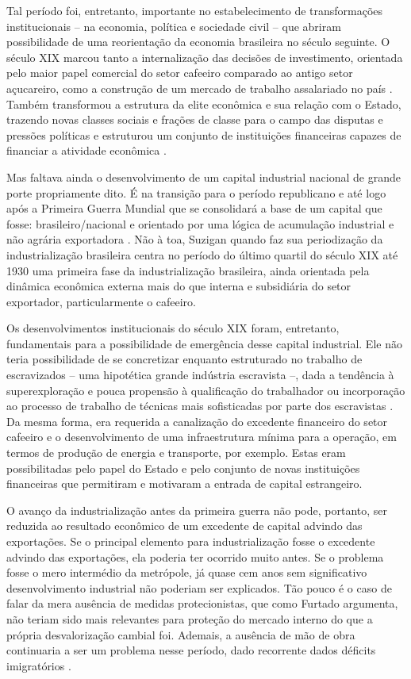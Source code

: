 Tal período foi, entretanto, importante no estabelecimento de
transformações institucionais -- na economia, política e sociedade civil
-- que abriram possibilidade de uma reorientação da economia brasileira
no século seguinte. O século XIX marcou tanto a internalização das
decisões de investimento, orientada pelo maior papel comercial do setor
cafeeiro comparado ao antigo setor açucareiro, como a construção de um
mercado de trabalho assalariado no país
\citep{mello1982}. Também
transformou a estrutura da elite econômica e sua relação com o Estado,
trazendo novas classes sociais e frações de classe para o campo das
disputas e pressões políticas
\citep{furtado2005} e
estruturou um conjunto de instituições financeiras capazes de financiar
a atividade econômica
\citep{pradojunior2012}.

Mas faltava ainda o desenvolvimento de um capital industrial nacional de
grande porte propriamente dito. É na transição para o período
republicano e até logo após a Primeira Guerra Mundial que se consolidará
a base de um capital que fosse: brasileiro/nacional e orientado por uma
lógica de acumulação industrial e não agrária exportadora
\citep{mello1982}. Não à
toa, Suzigan \citep{suzigan2000} quando faz sua periodização da industrialização brasileira centra
no período do último quartil do século XIX até 1930 uma primeira fase da
industrialização brasileira, ainda orientada pela dinâmica econômica
externa mais do que interna e subsidiária do setor exportador,
particularmente o cafeeiro.

Os desenvolvimentos institucionais do século XIX foram, entretanto,
fundamentais para a possibilidade de emergência desse capital
industrial. Ele não teria possibilidade de se concretizar enquanto
estruturado no trabalho de escravizados -- uma hipotética grande
indústria escravista --, dada a tendência à superexploração e pouca
propensão à qualificação do trabalhador ou incorporação ao processo de
trabalho de técnicas mais sofisticadas por parte dos escravistas
\citep{mello1982}. Da
mesma forma, era requerida a canalização do excedente financeiro do
setor cafeeiro e o desenvolvimento de uma infraestrutura mínima para a
operação, em termos de produção de energia e transporte, por exemplo.
Estas eram possibilitadas pelo papel do Estado e pelo conjunto de novas
instituições financeiras que permitiram e motivaram a entrada de capital
estrangeiro.

O avanço da industrialização antes da primeira guerra não pode,
portanto, ser reduzida ao resultado econômico de um excedente de capital
advindo das exportações. Se o principal elemento para industrialização
fosse o excedente advindo das exportações, ela poderia ter ocorrido
muito antes. Se o problema fosse o mero intermédio da metrópole, já
quase cem anos sem significativo desenvolvimento industrial não poderiam
ser explicados. Tão pouco é o caso de falar da mera ausência de medidas
protecionistas, que como Furtado
\citep{furtado2005}
argumenta, não teriam sido mais relevantes para proteção do mercado
interno do que a própria desvalorização cambial foi. Ademais, a ausência
de mão de obra continuaria a ser um problema nesse período, 
dado recorrente dados déficits imigratórios
\citep{pradojunior2012}.

